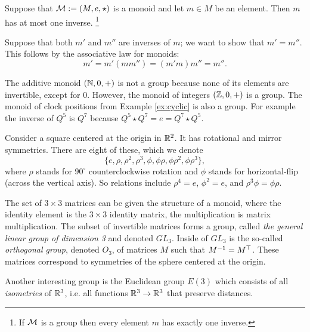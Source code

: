 \begin{propositionENG}
Suppose that $\mathcal{M}:=(M,e,\star)$ is a monoid and let $m\in M$ be an element. Then $m$ has at most one inverse.
\footnote{If $\mathcal{M}$ is a group then every element $m$ has exactly one inverse.}
\end{propositionENG}

\begin{propositionRUS}
\end{propositionRUS}

\begin{proofENG}
Suppose that both $m'$ and $m''$ are inverses of $m$; we want to show that $m'=m''$. This follows by the associative law for monoids:
$$m'=m'(mm'')=(m'm)m''=m''.$$
\end{proofENG}

\begin{proofRUS}
\end{proofRUS}

\begin{exampleENG}
The additive monoid $({\mathbb N},0,+)$ is not a group because none of its elements are invertible, except for $0$. However, the monoid of integers $({\mathbb Z},0,+)$ is a group. The monoid of clock positions from Example \ref{ex:cyclic} is also a group. For example the inverse of $Q^5$ is $Q^7$ because $Q^5\star Q^7=e=Q^7\star Q^5$.
\end{exampleENG}

\begin{exampleRUS}
\end{exampleRUS}

\begin{exampleENG}
Consider a square centered at the origin in ${\mathbb R}^2$. It has rotational and mirror symmetries. There are eight of these, which we denote $$\{e,\rho,\rho^2,\rho^3,\phi,\phi\rho,\phi\rho^2,\phi\rho^3\},$$ where $\rho$ stands for $90^\circ$ counterclockwise rotation and $\phi$ stands for horizontal-flip (across the vertical axis). So relations include $\rho^4=e$, $\phi^2=e$, and $\rho^3\phi=\phi\rho$.
\end{exampleENG}

\begin{exampleRUS}
\end{exampleRUS}

\begin{exampleENG}\label{ex:important groups}
The set of $3\times 3$ matrices can be given the structure of a monoid, where the identity element is the $3\times 3$ identity matrix, the multiplication is matrix multiplication. The subset of invertible matrices forms a group, called {\em the general linear group of dimension 3} and denoted $GL_3$. Inside of $GL_3$ is the so-called {\em orthogonal group}, denoted $O_3$, of matrices $M$ such that $M^\m1=M^\top$. These matrices correspond to symmetries of the sphere centered at the origin.

Another interesting group is the Euclidean group $E(3)$ which consists of all {\em isometries} of ${\mathbb R}^3$, i.e. all functions ${\mathbb R}^3\rightarrow{\mathbb R}^3$ that preserve distances.  
\end{exampleENG}

